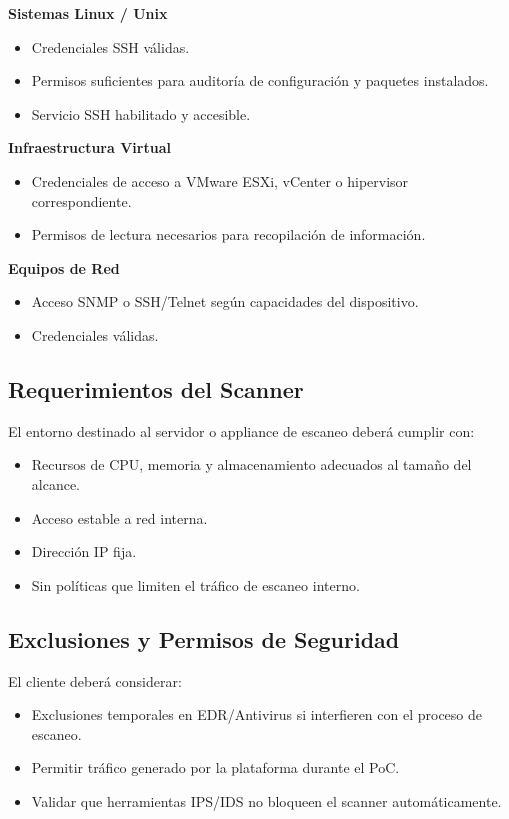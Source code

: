 \documentclass[a4paper]{article}
\begin{document}
    \textbf{Sistemas Linux / Unix}
        \begin{itemize}
            \item Credenciales SSH válidas.
            \item Permisos suficientes para auditoría de configuración y paquetes instalados.
            \item Servicio SSH habilitado y accesible.
        \end{itemize}

    \textbf{Infraestructura Virtual}
        \begin{itemize}
            \item Credenciales de acceso a VMware ESXi, vCenter o hipervisor correspondiente.
            \item Permisos de lectura necesarios para recopilación de información.
        \end{itemize}

    \textbf{Equipos de Red}
        \begin{itemize}
            \item Acceso SNMP o SSH/Telnet según capacidades del dispositivo.
            \item Credenciales válidas.
        \end{itemize}

    \subsection{Requerimientos del Scanner}
    El entorno destinado al servidor o appliance de escaneo deberá cumplir con:
    \begin{itemize}
        \item Recursos de CPU, memoria y almacenamiento adecuados al tamaño del alcance.
        \item Acceso estable a red interna.
        \item Dirección IP fija.
        \item Sin políticas que limiten el tráfico de escaneo interno.
    \end{itemize}

    \subsection{Exclusiones y Permisos de Seguridad}
    El cliente deberá considerar:
    \begin{itemize}
        \item Exclusiones temporales en EDR/Antivirus si interfieren con el proceso de escaneo.
        \item Permitir tráfico generado por la plataforma durante el PoC.
        \item Validar que herramientas IPS/IDS no bloqueen el scanner automáticamente.
    \end{itemize}
\end{document}
